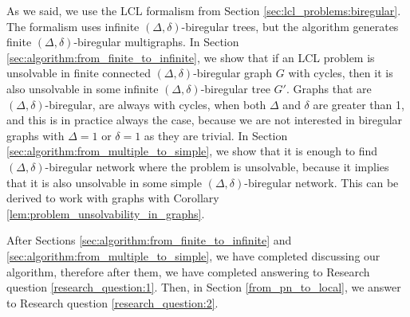 As we said, we use the LCL formalism from Section \ref{sec:lcl_problems:biregular}.
The formalism uses infinite $(\Delta, \delta)$-biregular trees, but the algorithm generates finite $(\Delta, \delta)$-biregular multigraphs.
In Section \ref{sec:algorithm:from_finite_to_infinite}, we show that if an LCL problem is unsolvable in finite connected $(\Delta, \delta)$-biregular graph $G$ with cycles, then it is also unsolvable in some infinite $(\Delta, \delta)$-biregular tree $G'$.
Graphs that are $(\Delta, \delta)$-biregular, are always with cycles, when both $\Delta$ and $\delta$ are greater than 1, and this is in practice always the case, because we are not interested in biregular graphs with $\Delta=1$ or $\delta=1$ as they are trivial.
In Section \ref{sec:algorithm:from_multiple_to_simple}, we show that it is enough to find $(\Delta, \delta)$-biregular network where the problem is unsolvable, because it implies that it is also unsolvable in some simple $(\Delta, \delta)$-biregular network.
This can be derived to work with graphs with Corollary \ref{lem:problem_unsolvability_in_graphs}.



After Sections \ref{sec:algorithm:from_finite_to_infinite} and \ref{sec:algorithm:from_multiple_to_simple}, we have completed discussing our algorithm, therefore after them, we have completed answering to Research question \ref{research_question:1}.
Then, in Section \ref{from_pn_to_local}, we answer to Research question \ref{research_question:2}.

